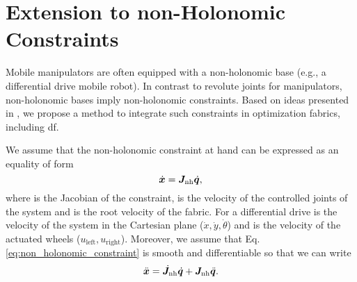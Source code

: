 \section{Extension to non-Holonomic Constraints}%
\label{sec:non_holonomic_constraints}
%
Mobile manipulators are often equipped with a non-holonomic base (e.g., a
differential drive mobile robot). In contrast to revolute joints for
manipulators, non-holonomic bases imply non-holonomic constraints. Based on
ideas presented in \cite{Meng2019}, we propose a method to integrate such
constraints in optimization fabrics, including \ac{df}.

We assume that the non-holonomic constraint at hand can be expressed as an
equality of form
\begin{equation}
  \dot{\bm{x}} = \bm{J}_{\textrm{nh}}\dot{\bm{q}},
  \label{eq:non_holonomic_constraint}
\end{equation}
where \Jnh{} is the Jacobian of the constraint, \qdot{} is
the velocity of the controlled joints of the system and \xdot{} is the root velocity of
the fabric. For a differential drive \xdot{} is the velocity of the system in the
Cartesian plane ($\dot{x}, \dot{y}, \dot{\theta}$) and \qdot{} is the velocity of the
actuated wheels ($u_{\textrm{left}}, u_{\textrm{right}}$). Moreover, we assume that Eq.
\ref{eq:non_holonomic_constraint} is smooth and differentiable so that we can write 
\begin{equation}
  \ddot{\bm{x}} = \dot{\bm{J}}_{\textrm{nh}}\dot{\bm{q}} + \bm{J}_{\textrm{nh}}\ddot{\bm{q}}.
  \label{eq:non_holonomic_constraint_derived}
\end{equation}

